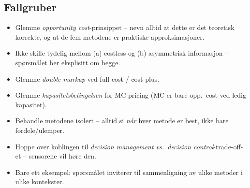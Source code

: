 \subsection*{Fallgruber}
\begin{itemize}\setlength{\itemsep}{2pt}
\item Glemme \emph{opportunity cost}-prinsippet -- nevn alltid at dette er det teoretisk korrekte, og at de fem metodene er praktiske approksimasjoner.
\item Ikke skille tydelig mellom (a) costless og (b) asymmetrisk informasjon -- spørsmålet ber eksplisitt om begge.
\item Glemme \emph{double markup} ved full cost / cost-plus.
\item Glemme \emph{kapasitetsbetingelsen} for MC-pricing (MC er bare opp.\ cost ved ledig kapasitet).
\item Behandle metodene isolert -- alltid si \emph{når} hver metode er best, ikke bare fordele/ulemper.
\item Hoppe over koblingen til \emph{decision management vs.\ decision control}-trade-off-et -- sensorene vil h\o re den.
\item Bare ett eksempel; spørsmålet inviterer til sammenligning av ulike metoder i ulike kontekster.
\end{itemize}

\FloatBarrier
